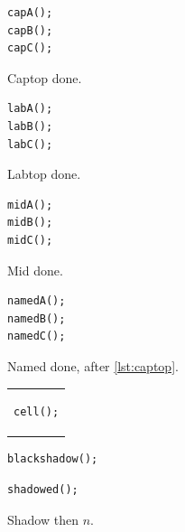 \documentclass{article}
\begin{document}
\begin{lrbox}{\lstbox}\begin{lstlisting}[caption={Captioned top},label=lst:captop,boxpos=t]
capA();
capB();
capC();
\end{lstlisting}\end{lrbox}
Captop \fbox{\usebox{\lstbox}} done.

\begin{lrbox}{\lstbox}\begin{lstlisting}[label=lst:labtop,boxpos=t]
labA();
labB();
labC();
\end{lstlisting}\end{lrbox}
Labtop \fbox{\usebox{\lstbox}} done.

\begin{lrbox}{\lstbox}\begin{lstlisting}[boxpos=m]
midA();
midB();
midC();
\end{lstlisting}\end{lrbox}
Mid \fbox{\usebox{\lstbox}} done.

\begin{lrbox}{\lstbox}\begin{lstlisting}[boxpos=center]
namedA();
namedB();
namedC();
\end{lstlisting}\end{lrbox}
Named \fbox{\usebox{\lstbox}} done, after \ref{lst:captop}.

\begin{tabular}{l}\begin{lstlisting}[caption={Cell below},captionpos=b]
cell();
\end{lstlisting}\end{tabular}

\begin{lstlisting}[frame=shadowbox,rulesepcolor=\color{black}]
blackshadow();
\end{lstlisting}

\begin{lrbox}{\lstbox}\begin{lstlisting}[frame=shadowbox,rulesepcolor=\color{blue}]
shadowed();
\end{lstlisting}\end{lrbox}
Shadow \fbox{\usebox{\lstbox}} then $n$.
\end{document}
